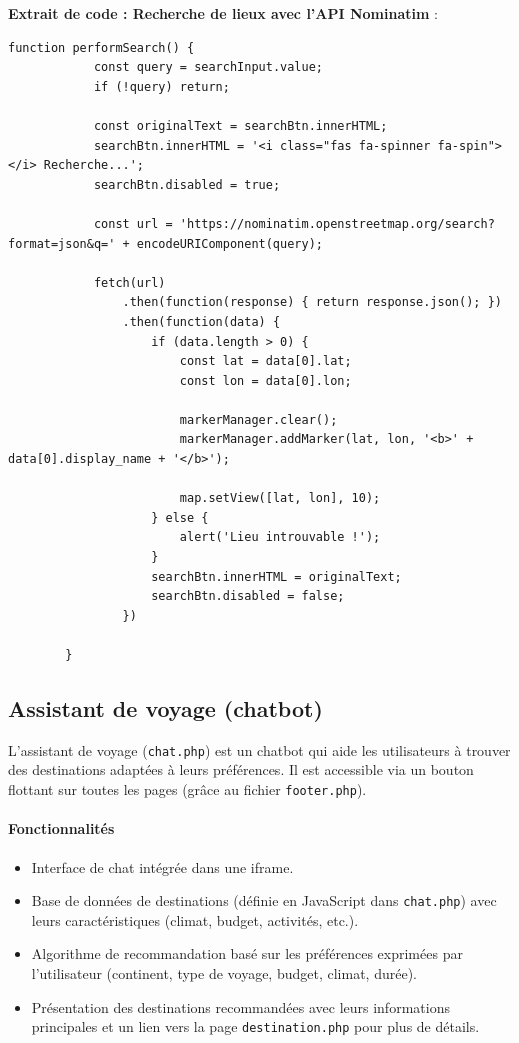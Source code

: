 \documentclass[a4paper,12pt]{article}
\begin{document}
\textbf{Extrait de code : Recherche de lieux avec l'API Nominatim} :
\begin{lstlisting}
function performSearch() {
            const query = searchInput.value;
            if (!query) return;

            const originalText = searchBtn.innerHTML;
            searchBtn.innerHTML = '<i class="fas fa-spinner fa-spin"></i> Recherche...';
            searchBtn.disabled = true;

            const url = 'https://nominatim.openstreetmap.org/search?format=json&q=' + encodeURIComponent(query);

            fetch(url)
                .then(function(response) { return response.json(); })
                .then(function(data) {
                    if (data.length > 0) {
                        const lat = data[0].lat;
                        const lon = data[0].lon;

                        markerManager.clear();
                        markerManager.addMarker(lat, lon, '<b>' + data[0].display_name + '</b>');

                        map.setView([lat, lon], 10);
                    } else {
                        alert('Lieu introuvable !');
                    }
                    searchBtn.innerHTML = originalText;
                    searchBtn.disabled = false;
                })
           
        }
\end{lstlisting}

\subsection{Assistant de voyage (chatbot)}

L'assistant de voyage (\texttt{chat.php}) est un chatbot qui aide les utilisateurs à trouver des destinations adaptées à leurs préférences. Il est accessible via un bouton flottant sur toutes les pages (grâce au fichier \texttt{footer.php}).

\paragraph{Fonctionnalités}
\begin{itemize}
  \item Interface de chat intégrée dans une iframe.
  \item Base de données de destinations (définie en JavaScript dans \texttt{chat.php}) avec leurs caractéristiques (climat, budget, activités, etc.).
  \item Algorithme de recommandation basé sur les préférences exprimées par l'utilisateur (continent, type de voyage, budget, climat, durée).
  \item Présentation des destinations recommandées avec leurs informations principales et un lien vers la page \texttt{destination.php} pour plus de détails.
\end{itemize}
\end{document}
